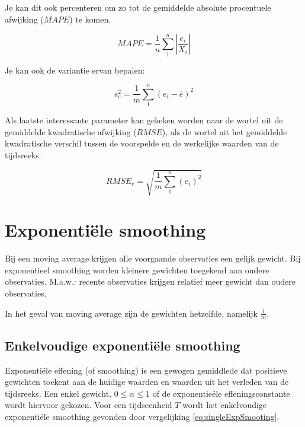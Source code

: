 Je kan dit ook percenteren om zo tot de gemiddelde absolute procentuele afwijking ($MAPE$) te komen.

\begin{definition}[$MAPE$]
\begin{equation}
	MAPE = \frac{1}{n} \sum_{1}^{n} \left| \frac{e_{i}}{X_i} \right|  
\label{eq:MAD2}
\end{equation}
\end{definition}


Je kan ook de variantie ervan bepalen:

\begin{definition}[$VAR$]
\begin{equation}
	s^{2}_{e} = \frac{1}{m} \sum_{1}^{n} (e_{i} - \overline{e})^{2}
\label{eq:varError}
\end{equation}
\end{definition}

Als laatste interessante parameter kan gekeken worden naar de wortel uit de gemiddelde kwadratische afwijking ($RMSE$), als de wortel uit het gemiddelde kwadratische verschil tussen de voorspelde en de werkelijke waarden van de tijdsreeks.

\begin{definition}[$RMSE$]
\begin{equation}
	RMSE_{e} = \sqrt{\frac{1}{m} \sum_{1}^{n} (e_{i})^{2}}
\label{eq:varError2}
\end{equation}
\end{definition}

\pagebreak
\section{Exponenti\"ele smoothing}
Bij een moving average krijgen alle voorgaande observaties een gelijk gewicht. Bij exponentieel smoothing worden kleinere gewichten toegekend aan oudere observaties. M.a.w.: recente observaties krijgen relatief meer gewicht dan oudere observaties.

In het geval van moving average zijn de gewichten hetzelfde, namelijk $\frac{1}{m}$.

\subsection{Enkelvoudige exponenti\"ele smoothing}
Exponenti\"ele effening (of smoothing) is een gewogen gemiddlede dat positieve gewichten toekent aan de huidige waarden en waarden uit het verleden van de tijdsreeks. Een enkel gewicht, $0\leq \alpha \leq1$ of de exponentie\"ele effeningsconstante wordt hiervoor gekozen. 
Voor een tijdseenheid $T$ wordt het enkelvoudige exponenti\"ele smoothing gevonden door vergelijking \ref{eq:singleExpSmooting}.

